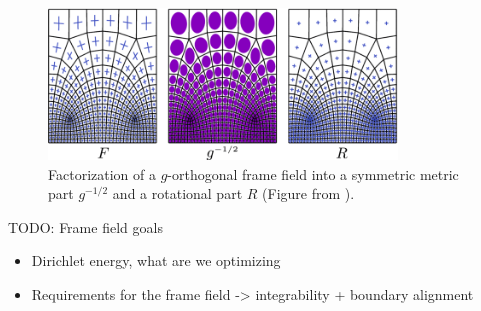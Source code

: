 \documentclass[../thesis.tex]{subfiles}
\begin{document}
\begin{figure}[htb]
  \centering
  \includegraphics[width=25em]{figures/factorization}
  \caption{Factorization of a $g$-orthogonal frame field into a symmetric metric part $g^{-1/2}$ and a rotational part $R$
  (Figure from \cite{Fang23}).}
  \label{fig:factorization}
\end{figure}

TODO:
Frame field goals

\begin{itemize}
  \item Dirichlet energy, what are we optimizing
  \item Requirements for the frame field -> integrability + boundary alignment
\end{itemize}
\end{document}
